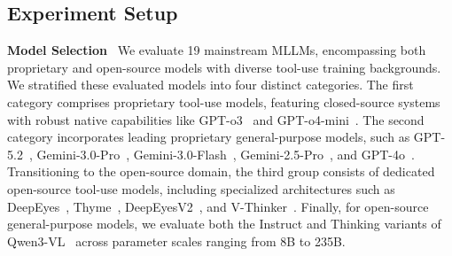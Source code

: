\documentclass[runningheads]{llncs}
\begin{document}

\subsection{Experiment Setup}\label{sec:experiment_setup}
\noindent \textbf{Model Selection}~
We evaluate 19 mainstream MLLMs, encompassing both proprietary and open-source models with diverse tool-use training backgrounds. We stratified these evaluated models into four distinct categories. The first category comprises proprietary tool-use models, featuring closed-source systems with robust native capabilities like GPT-o3~\cite{openai2025o3o4mini} and GPT-o4-mini~\cite{openai2025o3o4mini}. The second category incorporates leading proprietary general-purpose models, such as GPT-5.2~\cite{openai2025gpt52}, Gemini-3.0-Pro~\cite{google2026gemini}, Gemini-3.0-Flash~\cite{google2025gemini3flash}, Gemini-2.5-Pro~\cite{gemini-2.5-pro}, and GPT-4o~\cite{openai2025o3o4mini}. Transitioning to the open-source domain, the third group consists of dedicated open-source tool-use models, including specialized architectures such as DeepEyes~\cite{zheng2025deepeyes}, Thyme~\cite{zhang2025thyme}, DeepEyesV2~\cite{hong2025deepeyesv2}, and V-Thinker~\cite{v-thinker}. Finally, for open-source general-purpose models, we evaluate both the Instruct and Thinking variants of Qwen3-VL~\cite{qwen3-vl} across parameter scales ranging from 8B to 235B.
\end{document}

